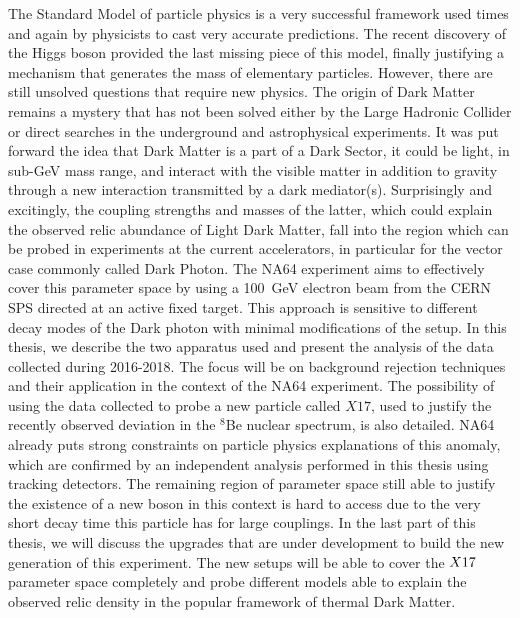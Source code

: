 The Standard Model of particle physics is a very successful framework used times and again by physicists to cast very accurate predictions. The recent discovery of the Higgs boson provided the last missing piece of this model, finally justifying a mechanism that generates the mass of elementary particles. However, there are still unsolved questions that require new physics. The origin of Dark Matter remains a mystery that has not been solved either by the Large Hadronic Collider or direct searches in the underground and astrophysical experiments. It was put forward the idea that Dark Matter is a part of a Dark Sector, it could be light, in sub-\si{\giga\electronvolt} mass range, and interact with the visible matter in addition to gravity through a new interaction transmitted by a dark mediator(s).  
Surprisingly and excitingly, the coupling strengths and masses of the latter, which could explain the observed relic abundance of Light Dark Matter, fall into the region  which can be probed in experiments at the current accelerators,  in particular for the vector case commonly called Dark Photon. The NA64 experiment aims to effectively cover this parameter space by using a \SI{100}{\giga\electronvolt} electron beam from the CERN SPS directed at an active fixed target. This approach is sensitive to different decay modes of the Dark photon with minimal modifications of the setup. In this thesis, we describe the two apparatus used and present the analysis of the data collected during 2016-2018. The focus will be on background rejection techniques and their application in the context of the NA64 experiment. The possibility of using the data collected to probe a new particle called $X17$, used to justify the recently observed deviation in the $^8$Be nuclear spectrum, is also detailed. NA64 already puts strong constraints on particle physics explanations of this anomaly, which are confirmed by an independent analysis performed in this thesis using tracking detectors. The remaining region of parameter space still able to justify the existence of a new boson in this context is hard to access due to the very short decay time this particle has for large couplings. In the last part of this thesis, we will discuss the upgrades that are under development to build the new generation of this experiment. The new setups will be able to cover the $X17$ parameter space completely and probe different models able to explain the observed relic density in the popular framework of thermal Dark Matter.
